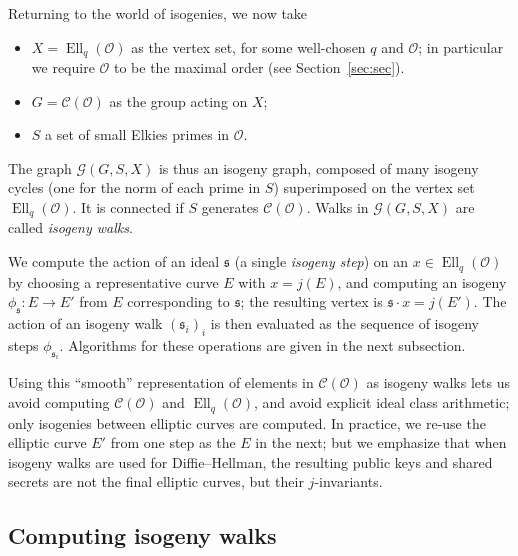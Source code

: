 \documentclass{llncs}
\newcommand{\Cl}{\mathcal{C}}
\newcommand{\Graph}{\mathcal{G}}
\renewcommand{\O}{\mathcal{O}}
\renewcommand{\frak}{\mathfrak}
\DeclareMathOperator{\Ell}{Ell}
\begin{document}
Returning to the world of isogenies,
we now take
\begin{itemize}
    \item $X=\Ell_q(\O)$ as the vertex set, for some well-chosen $q$ and $\O$;
        in particular we require $\O$ to be the maximal order (see Section~\ref{sec:sec}).
    \item $G=\Cl(\O)$ as the group acting on $X$;
    \item $S$ a set of small Elkies primes in $\O$.
\end{itemize}
The graph $\Graph(G,S,X)$ is thus an isogeny graph, 
composed of many isogeny cycles (one for the norm of each prime in $S$) 
superimposed on the vertex set $\Ell_q(\O)$.
It is connected if $S$ generates $\Cl(\O)$.
Walks in $\Graph(G,S,X)$ are called \emph{isogeny walks}.

We compute the action of
an ideal $\frak s$ (a single \emph{isogeny step})
on an $x∈\Ell_q(\O)$ 
by choosing a representative curve $E$ with $x = j(E)$,
and computing an isogeny $ϕ_{\frak s}:E→E'$ from $E$
corresponding to $\frak{s}$;
the resulting vertex is $\frak s \cdot x = j(E')$.
The action of an isogeny walk $(\frak s_i)_i$
is then evaluated as the sequence of isogeny steps $ϕ_{\frak s_i}$. 
Algorithms for these operations are given in the next subsection. 

Using this ``smooth'' representation of elements
in $\Cl(\O)$ as isogeny walks
lets us avoid computing $\Cl(\O)$ and $\Ell_q(\O)$,
and avoid explicit ideal class arithmetic;
only isogenies between elliptic curves are computed.
In practice, we re-use the elliptic curve $E'$ from one step
as the $E$ in the next;
but we emphasize that
when isogeny walks are used for Diffie--Hellman,
the resulting public keys and shared secrets
are not the final elliptic curves,
but their $j$-invariants.


\subsection{Computing isogeny walks}
\end{document}
